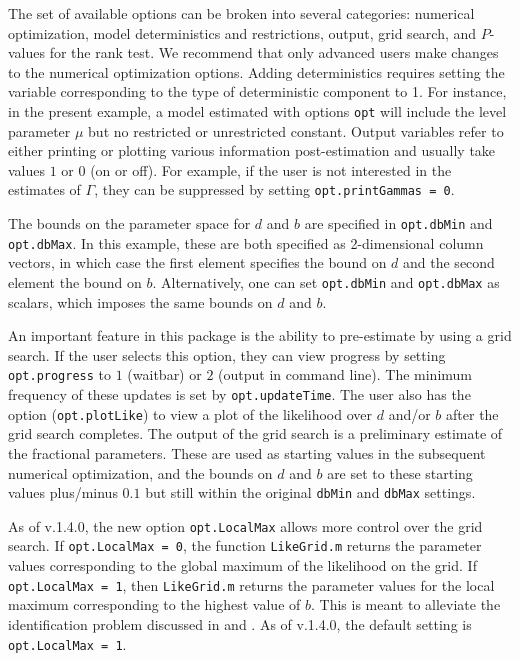 \documentclass[10pt]{article}
\begin{document}
The set of available options can be broken into several categories: numerical optimization, model deterministics and restrictions, output, grid search, and $P$-values for the rank test. We recommend that only advanced users make changes to the numerical optimization options. Adding deterministics requires setting the variable corresponding to the type of deterministic component to 1. For instance, in the present example, a model estimated with options \verb|opt| will include the level parameter $\mu$ but no restricted or unrestricted constant. Output variables refer to either printing or plotting various information post-estimation and usually take values $1$ or $0$ (on or off). For example, if the user is not interested in the estimates of $\Gamma$, they can be suppressed by setting \verb|opt.printGammas = 0|.

The bounds on the parameter space for $d$ and $b$ are specified in \verb|opt.dbMin| and \verb|opt.dbMax|. In this example, these are both specified as 2-dimensional column vectors, in which case the first element specifies the bound on $d$ and the second element the bound on $b$. Alternatively, one can set \verb|opt.dbMin| and \verb|opt.dbMax| as scalars, which imposes the same bounds on $d$ and $b$. 

An important feature in this package is the ability to pre-estimate by using a grid search. If the user selects this option, they can view progress by setting \verb|opt.progress| to $1$ (waitbar) or $2$ (output in command line). The minimum frequency of these updates is set by \verb|opt.updateTime|. The user also has the option (\verb|opt.plotLike|) to view a plot of the likelihood over $d$ and/or $b$ after the grid search completes. The output of the grid search is a preliminary estimate of the fractional parameters. These are used as starting values in the subsequent numerical optimization, and the bounds on $d$ and $b$ are set to these starting values plus/minus $0.1$ but still within the original \verb|dbMin| and \verb|dbMax| settings.

As of v.1.4.0, the new option \verb|opt.LocalMax| allows more control over the grid search. If \verb|opt.LocalMax = 0|, the function \verb|LikeGrid.m| returns the parameter values corresponding to the global maximum of the likelihood on the grid. If \verb|opt.LocalMax = 1|, then \verb|LikeGrid.m| returns the parameter values for the local maximum corresponding to the highest value of $b$. This is meant to alleviate the identification problem discussed in \citet[Section 2.3]{johniel2010} and \cite{Carlini2014}. As of v.1.4.0, the default setting is \verb|opt.LocalMax = 1|.
\end{document}
